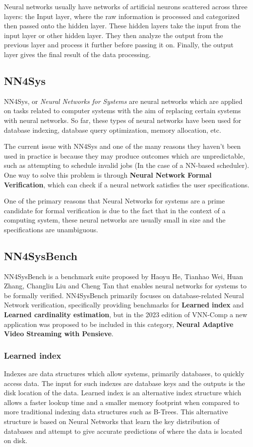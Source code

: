 \documentclass[12pt]{report}
\begin{document}
Neural networks usually have networks of artificial neurons scattered across three layers: the Input layer, where the raw information is processed and categorized then passed onto the hidden layer.
These hidden layers take the input from the input layer or other hidden layer.
They then analyze the output from the previous layer and process it further before passing it on.
Finally, the output layer gives the final result of the data processing. \cite{aws-nn}

\subsection{NN4Sys}
NN4Sys, or \textit{Neural Networks for Systems} are neural networks which are applied on tasks related to computer systems with the aim of replacing certain systems with neural networks.
So far, these types of neural networks have been used for database indexing, database query optimization, memory allocation, etc.

The current issue with NN4Sys and one of the many reasons they haven't been used in practice is because they may produce outcomes which are unpredictable, such as attempting to schedule invalid jobs (In the case of a NN-based scheduler). 
One way to solve this problem is through \textbf{Neural Network Formal Verification}, which can check if a neural network satisfies the user specifications. 

One of the primary reasons that Neural Networks for systems are a prime candidate for formal verification is due to the fact that in the context of a computing system, these neural networks are usually small in size and the specifications are unambiguous. \autocite{nn4sysbench2022} 

\subsection{NN4SysBench}
NN4SysBench is a benchmark suite proposed by Haoyu He, Tianhao Wei, Huan Zhang, Changliu Liu and Cheng Tan that enables neural networks for systems to be formally verified.
NN4SysBench primarily focuses on database-related Neural Network verification, specifically providing benchmarks for \textbf{Learned index} and \textbf{Learned cardinality estimation}, but in the 2023 edition of VNN-Comp a new application was proposed to be included in this category, \textbf{Neural Adaptive Video Streaming with Pensieve}. \autocite{nn4sysbench2022}

\subsubsection{Learned index}
Indexes are data structures which allow systems, primarily databases, to quickly access data.
The input for such indexes are database keys and the outputs is the disk location of the data.
Learned index is an alternative index structure which allows a faster lookup time and a smaller memory footprint when compared to more traditional indexing data structures such as B-Trees.
This alternative structure is based on Neural Networks that learn the key distribution of databases and attempt to give accurate predictions of where the data is located on disk. \autocite{nn4sysbench2022}
\end{document}
